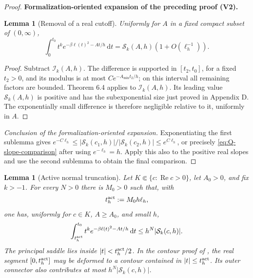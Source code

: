 \documentclass[11pt]{article}
\newtheorem{lemma}[theorem]{Lemma}
\newcommand{\formalisationparentid}{X}
\newenvironment{formalisationaddition}[1]{\par\medskip\begingroup\color{blue}\def\formalisationparentid{#1}\setcounter{formalizationsublemma}{0}\let\lemma\formalizationsublemma\let\endlemma\endformalizationsublemma
  \def\Eo{\mathcal E_h^\circ}\def\EE{\mathcal E_h}\def\phio{\phi_h^\circ}\def\phih{\phi_h}\def\Ho{H_h^{\rm atom}(v^\circ)}\def\Ha{H_h^{\rm atom}}\def\HL{H_h^{L}}\def\Dh{D_h}\def\Log{\operatorname{Log}}\def\ellh{\ell_h}\def\Gp{G_{p,h}}\def\Ast{A_{*,h}}\def\ahat{\widehat{\mathfrak a}_h}\def\ah{\mathfrak a_h}\def\rh{\widehat\rho_h}\def\deltah{\widehat\delta_h}\def\oldref##1{\textup{(##1)}}\def\interface##1{\par\noindent\textit{Analytical interface used here.} ##1\par}\def\finish{\par\noindent\textit{Conclusion of the formalization-oriented expansion.} }\par\noindent\textbf{Formalization-oriented expansion of the preceding proof (V2).}\par\smallskip
}{\par\endgroup\medskip
}
\newcommand{\dd}{\,\mathrm d}
\newcommand{\Rea}{\operatorname{Re}}
\begin{document}
\begin{proof}
\begin{formalisationaddition}{C6.5}
\begin{lemma}[Removal of a real cutoff]\label{sublemma:C6-5-uncut}
Uniformly for $A$ in a fixed compact subset of $(0,\infty)$,
\[
 \int_0^{t_0}t^ke^{-\beta\ell(t)^2-At/h}\,\mathrm dt
 =\mathcal S_k(A,h)(1+O(\ellh^{-1})).
\]
\end{lemma}
\begin{proof}
Subtract $\mathcal I_k(A,h)$. The difference is supported in $[t_2,t_0]$, for a fixed $t_2>0$, and its modulus is at most $Ce^{-A_{\min}t_2/h}$; on this interval all remaining factors are bounded. Theorem 6.4 applies to $\mathcal I_k(A,h)$. Its leading value $\mathcal S_k(A,h)$ is positive and has the subexponential size just proved in Appendix D. The exponentially small difference is therefore negligible relative to it, uniformly in $A$.
\end{proof}
\finish Exponentiating the first sublemma gives $e^{-C\ellh}\le |\mathcal S_k(c_1,h)|/|\mathcal S_k(c_2,h)|\le e^{C\ellh}$, or precisely \eqref{eq:Q-slope-comparison} after using $e^{-\ellh}=h$. Apply this also to the positive real slopes and use the second sublemma to obtain the final comparison.
\end{formalisationaddition}

\end{proof}

\begin{lemma}[Active normal truncation]\label{lem:active-normal-tail}
Let $K\Subset\{c:\Rea c>0\}$, let $A_0>0$, and fix $k>-1$.  For every
$N>0$ there is $M_0>0$ such that, with
\begin{equation}\label{eq:active-normal-scale}
 t_h^{\rm act}:=M_0h\ell_h,
\end{equation}
one has, uniformly for $c\in K$, $A\ge A_0$, and small $h$,
\begin{equation}\label{eq:active-normal-tail}
 \int_{t_h^{\rm act}}^{t_0}t^k
 e^{-\beta\ell(t)^2-At/h}\dd t
 \le h^N|\mathcal S_k(c,h)|.
\end{equation}
The principal saddle lies inside $|t|<t_h^{\rm act}/2$.  In the contour proof of
, the real segment
$[0,t_h^{\rm act}]$ may be deformed to a contour contained in $|t|\le t_h^{\rm act}$. Its outer
connector also contributes at most $h^N|\mathcal S_k(c,h)|$.
\end{lemma}
\end{document}
